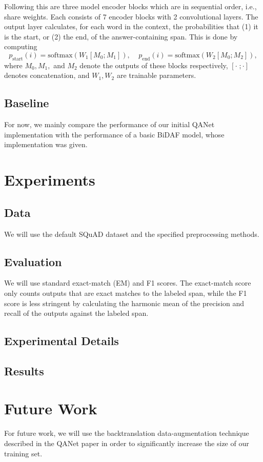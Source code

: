 \documentclass{article}
\begin{document}
Following this are three model encoder blocks which are in sequential order, i.e., share weights. Each consists of 7 encoder blocks with 2 convolutional layers. The output layer calculates, for each word in the context, the probabilities that (1) it is the start, or (2) the end, of the answer-containing span. This is done by computing 
$$p_{\text{start}}(i)=\text{softmax}(W_1[M_0;M_1]),\;\;\;\; p_{\text{end}}(i)=\text{softmax}(W_2[M_0;M_2]),$$
where $M_0,M_1,$ and $M_2$ denote the outputs of these blocks respectively, $[\cdot \;; \cdot]$ denotes concatenation, and $W_1,W_2$ are trainable parameters.

\subsection{Baseline}
For now, we mainly compare the performance of our initial QANet implementation with the performance of a basic BiDAF model, whose implementation was given.

\section{Experiments}
\subsection{Data}
We will use the default SQuAD dataset and the specified preprocessing methods.

\subsection{Evaluation}
We will use standard exact-match (EM) and F1 scores. The exact-match score only counts outputs that are exact matches to the labeled span, while the F1 score is less stringent by calculating the harmonic mean of the precision and recall of the outputs against the labeled span.

\subsection{Experimental Details}

\subsection{Results}

\section{Future Work}
For future work, we will use the backtranslation data-augmentation technique described in the QANet paper in order to significantly increase the size of our training set.



\end{document}
